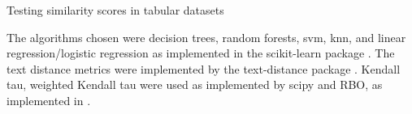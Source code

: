 \begin{algorithm}[hbtp]
\SetAlgoLined



 \caption{Testing similarity scores in tabular datasets}
 \label{alg:simil_1}

\end{algorithm}



The algorithms chosen were decision trees, random forests, \ac{svm},  \ac{knn}, and linear regression/logistic regression as implemented in the scikit-learn package \cite{scikit-learn}. The text distance metrics were implemented by the text-distance package \cite{orsiniumTextdistanceComputeDistance}. Kendall tau, weighted Kendall tau were used as implemented by scipy \cite{virtanenSciPyFundamentalAlgorithms2020a} and RBO, as implemented in \cite{chenRankbiasedOverlapRBO2023}.






